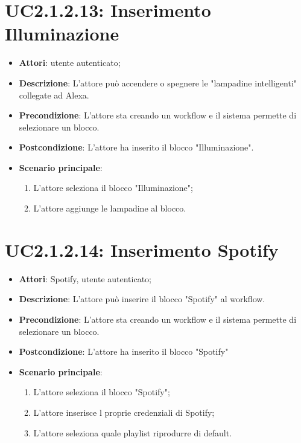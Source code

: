 \section{UC2.1.2.13: Inserimento Illuminazione}
\label{UC2.1.2.13}
\begin{itemize}
	\item \textbf{Attori}: utente autenticato;
	\item \textbf{Descrizione}: L'attore può accendere o spegnere le "lampadine intelligenti" collegate ad Alexa.
	\item \textbf{Precondizione}: L'attore sta creando un workflow e il sistema permette di selezionare un blocco.
	\item \textbf{Postcondizione}: L'attore ha inserito il blocco "Illuminazione".
	\item \textbf{Scenario principale}:
	\begin{enumerate} \item L'attore seleziona il blocco "Illuminazione";  \item  L'attore aggiunge le lampadine al blocco.\end{enumerate}
\end{itemize}

\section{UC2.1.2.14: Inserimento Spotify}
\label{UC2.1.2.14}
\begin{itemize}
	\item \textbf{Attori}: Spotify, utente autenticato;
	\item \textbf{Descrizione}: L'attore può inserire il blocco "Spotify" al workflow.
	\item \textbf{Precondizione}: L'attore sta creando un workflow e il sistema permette di selezionare un blocco.
	\item \textbf{Postcondizione}: L'attore ha inserito il blocco "Spotify"
	\item \textbf{Scenario principale}:
	\begin{enumerate} \item L'attore seleziona il blocco "Spotify";  \item  L'attore inserisce l proprie credenziali di Spotify;  \item  L'attore seleziona quale playlist riprodurre di default.\end{enumerate}
\end{itemize}

